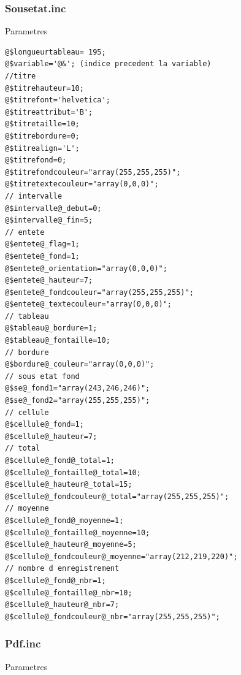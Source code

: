 \documentclass[letterpaper,10pt,french]{manual}
\begin{document}
\subsubsection{Sousetat.inc}

Parametres

\begin{Verbatim}[commandchars=@\[\]]
@$longueurtableau= 195;
@$variable='@&'; (indice precedent la variable)
//titre
@$titrehauteur=10;
@$titrefont='helvetica';
@$titreattribut='B';
@$titretaille=10;
@$titrebordure=0;
@$titrealign='L';
@$titrefond=0;
@$titrefondcouleur="array(255,255,255)";
@$titretextecouleur="array(0,0,0)";
// intervalle
@$intervalle@_debut=0;
@$intervalle@_fin=5;
// entete
@$entete@_flag=1;
@$entete@_fond=1;
@$entete@_orientation="array(0,0,0)";
@$entete@_hauteur=7;
@$entete@_fondcouleur="array(255,255,255)";
@$entete@_textecouleur="array(0,0,0)";
// tableau
@$tableau@_bordure=1;
@$tableau@_fontaille=10;
// bordure
@$bordure@_couleur="array(0,0,0)";
// sous etat fond
@$se@_fond1="array(243,246,246)";
@$se@_fond2="array(255,255,255)";
// cellule
@$cellule@_fond=1;
@$cellule@_hauteur=7;
// total
@$cellule@_fond@_total=1;
@$cellule@_fontaille@_total=10;
@$cellule@_hauteur@_total=15;
@$cellule@_fondcouleur@_total="array(255,255,255)";
// moyenne
@$cellule@_fond@_moyenne=1;
@$cellule@_fontaille@_moyenne=10;
@$cellule@_hauteur@_moyenne=5;
@$cellule@_fondcouleur@_moyenne="array(212,219,220)";
// nombre d enregistrement
@$cellule@_fond@_nbr=1;
@$cellule@_fontaille@_nbr=10;
@$cellule@_hauteur@_nbr=7;
@$cellule@_fondcouleur@_nbr="array(255,255,255)";
\end{Verbatim}


\subsubsection{Pdf.inc}

Parametres
\end{document}
